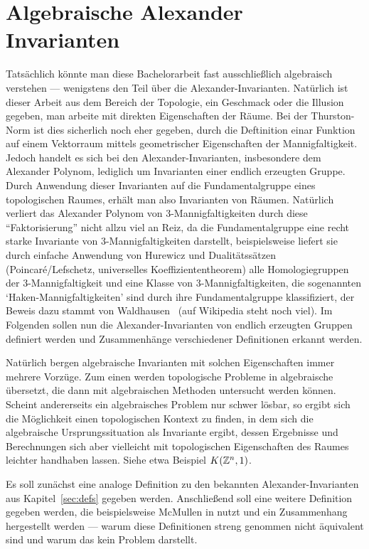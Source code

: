 
\section{Algebraische Alexander Invarianten}
\label{sec:algebra}
Tatsächlich könnte man diese Bachelorarbeit fast ausschließlich algebraisch verstehen --- wenigstens den Teil über die Alexander-Invarianten. Natürlich ist dieser Arbeit aus dem Bereich der Topologie, ein Geschmack oder die Illusion gegeben, man arbeite mit direkten Eigenschaften der Räume. Bei der Thurston-Norm ist dies sicherlich noch eher gegeben, durch die Deftinition einar Funktion auf einem Vektorraum mittels geometrischer Eigenschaften der Mannigfaltigkeit. Jedoch handelt es sich bei den Alexander-Invarianten, insbesondere dem Alexander Polynom, lediglich um Invarianten einer endlich erzeugten Gruppe. Durch Anwendung dieser Invarianten auf die Fundamentalgruppe eines topologischen Raumes, erhält man also Invarianten von Räumen. Natürlich verliert das Alexander Polynom von 3-Mannigfaltigkeiten durch diese "`Faktorisierung"' nicht allzu viel an Reiz, da die Fundamentalgruppe eine recht starke Invariante von 3-Mannigfaltigkeiten darstellt, beispielsweise liefert sie durch einfache Anwendung von Hurewicz und Dualitätssätzen (Poincaré/Lefschetz, universelles Koeffiziententheorem) alle Homologiegruppen der 3-Mannigfaltigkeit und eine Klasse von 3-Mannigfaltigkeiten, die sogenannten `Haken-Mannigfaltigkeiten' sind durch ihre Fundamentalgruppe klassifiziert, der Beweis dazu stammt von Waldhausen~\cite{Waldhausen.1968} (auf Wikipedia steht noch viel). Im Folgenden sollen nun die Alexander-Invarianten von endlich erzeugten Gruppen definiert werden und Zusammenhänge verschiedener Definitionen erkannt werden.

Natürlich bergen algebraische Invarianten mit solchen Eigenschaften immer mehrere Vorzüge. Zum einen werden topologische Probleme in algebraische übersetzt, die dann mit algebraischen Methoden untersucht werden können. Scheint andererseits ein algebraisches Problem nur schwer lösbar, so ergibt sich die Möglichkeit einen topologischen Kontext zu finden, in dem sich die algebraische Ursprungssituation als Invariante ergibt, dessen Ergebnisse und Berechnungen sich aber vielleicht mit topologischen Eigenschaften des Raumes leichter handhaben lassen. Siehe etwa Beispiel $K(\mathbb{Z}^n,1)$.

Es soll zunächst eine analoge Definition zu den bekannten Alexander-Invarianten aus Kapitel~\ref{sec:defs} gegeben werden. Anschließend soll eine weitere Definition gegeben werden, die beispielsweise McMullen in \cite{MCMULLEN.2002} nutzt und ein Zusammenhang hergestellt werden --- warum diese Definitionen streng genommen nicht äquivalent sind und warum das kein Problem darstellt.

